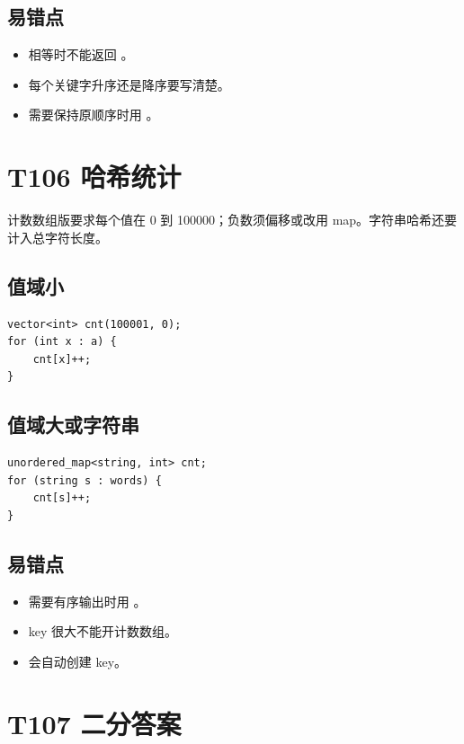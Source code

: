 \subsection{易错点}

\begin{itemize}
  \item 相等时不能返回 。
  \item 每个关键字升序还是降序要写清楚。
  \item 需要保持原顺序时用 。
\end{itemize}

\section{T106 哈希统计}\label{sec:09-8}\label{tpl:106}

计数数组版要求每个值在 0 到 100000；负数须偏移或改用 map。字符串哈希还要计入总字符长度。

\subsection{值域小}

\begin{lstlisting}
vector<int> cnt(100001, 0);
for (int x : a) {
    cnt[x]++;
}
\end{lstlisting}

\subsection{值域大或字符串}

\begin{lstlisting}
unordered_map<string, int> cnt;
for (string s : words) {
    cnt[s]++;
}
\end{lstlisting}

\subsection{易错点}

\begin{itemize}
  \item 需要有序输出时用 。
  \item key 很大不能开计数数组。
  \item {} 会自动创建 key。
\end{itemize}

\section{T107 二分答案}\label{sec:09-9}\label{tpl:107}

